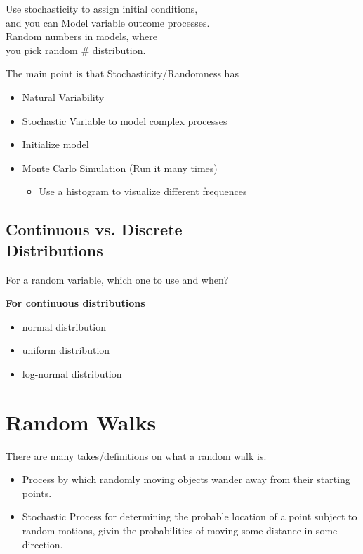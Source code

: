 \documentclass[12pt]{book}
\begin{document}
\noindent Use stochasticity to assign initial conditions,\\
and you can Model variable outcome processes.\\

\noindent Random numbers in models, where\\
you pick random \# distribution.

The main point is that Stochasticity/Randomness has
\begin{itemize} 
\item Natural Variability
\item Stochastic Variable to model complex processes
\item Initialize model
\item Monte Carlo Simulation (Run it many times)
	\begin{itemize} 
	\item Use a histogram to visualize different frequences
	\end{itemize} 
\end{itemize} 



\section{Continuous vs. Discrete \\Distributions}
\indent For a random variable, which one to use and when?

\noindent \textbf{For continuous distributions}
\begin{itemize}
\item normal distribution
\item uniform distribution
\item log-normal distribution
\end{itemize}






\chapter{Random Walks}
There are many takes/definitions on what a random walk is.
\begin{itemize}
\item Process by which randomly moving objects wander away from their starting points.
\item Stochastic Process for determining the probable location of a point subject to random motions, givin the probabilities of moving some distance in some direction.
\end{itemize}
\end{document}
